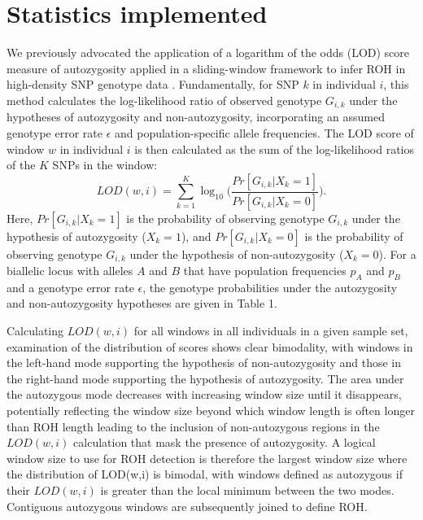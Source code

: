 \documentclass[12pt]{article}%
\begin{document}
\section{Statistics implemented}
\label{sec:lod}

We previously advocated the application of a logarithm of the odds (LOD) score measure of autozygosity applied in a sliding-window framework to infer ROH in high-density SNP genotype data \cite[]{PembertonEtAl12:AJHG}. Fundamentally, for SNP $k$ in individual $i$, this method calculates the log-likelihood ratio of observed genotype $G_{i,k}$ under the hypotheses of autozygosity and non-autozygosity, incorporating an assumed genotype error rate $\epsilon$ and population-specific allele frequencies. The LOD score of window $w$ in individual $i$ is then calculated as the sum of the log-likelihood ratios of the $K$ SNPs in the window: 
\begin{equation}
LOD(w,i)= \sum_{k=1}^K \log_{10}\Big(\frac{Pr[G_{i,k} | X_k = 1]}{Pr[G_{i,k} |X_k=0]}\Big).
\end{equation}
Here, $Pr[G_{i,k} |X_k=1]$ is the probability of observing genotype $G_{i,k}$ under the hypothesis of autozygosity ($X_k=1$), and $Pr[G_{i,k} |X_k=0]$ is the probability of observing genotype $G_{i,k}$ under the hypothesis of non-autozygosity ($X_k=0$). For a biallelic locus with alleles $A$ and $B$ that have population frequencies $p_A$ and $p_B$ and a genotype error rate $\epsilon$, the genotype probabilities under the autozygosity and non-autozygosity hypotheses are given in Table 1.

Calculating $LOD(w,i)$ for all windows in all individuals in a given sample set, examination of the distribution of scores shows clear bimodality, with windows in the left-hand mode supporting the hypothesis of non-autozygosity and those in the right-hand mode supporting the hypothesis of autozygosity. The area under the autozygous mode decreases with increasing window size until it disappears, potentially reflecting the window size beyond which window length is often longer than ROH length leading to the inclusion of non-autozygous regions in the $LOD(w,i)$ calculation that mask the presence of autozygosity. A logical window size to use for ROH detection is therefore the largest window size where the distribution of LOD(w,i) is bimodal, with windows defined as autozygous if their $LOD(w,i)$ is greater than the local minimum between the two modes. Contiguous autozygous windows are subsequently joined to define ROH.
\end{document}
